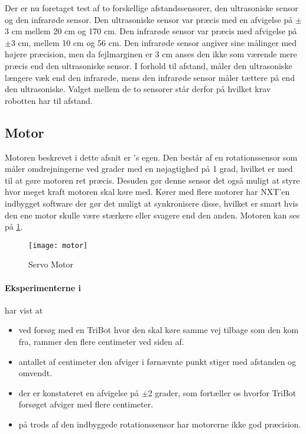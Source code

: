 Der er nu foretaget test af to forskellige afstandssensorer, den ultrasoniske sensor og den infrarøde sensor. 
Den ultrasoniske sensor var præcis med en afvigelse på $\pm$3 cm mellem 20 cm og 170 cm.
Den infrarøde sensor var præcis med afvigelse på $\pm$3 cm, mellem 10 cm og 56 cm.
Den infrarøde sensor angiver sine målinger med højere præcision, men da fejlmarginen er 3 cm anses den ikke som værende mere præcis end den ultrasoniske sensor.
I forhold til afstand, måler den ultrasoniske længere væk end den infrarøde, mens den infrarøde sensor måler tættere på end den ultrasoniske.
Valget mellem de to sensorer står derfor på hvilket krav robotten har til afstand.

\subsection{Motor}
Motoren beskrevet i dette afsnit er \lego's egen.
Den består af en rotationssensor som måler omdrejningerne ved grader med en nøjagtighed på 1 grad, hvilket er med til at gøre motoren ret præcis. 
Desuden gør denne sensor det også muligt at styre hvor meget kraft motoren skal køre med.
Kører med flere motorer har NXT'en indbygget software der gør det muligt at synkronisere disse, hvilket er smart hvis den ene motor skulle være stærkere eller svagere end den anden.\cite{tikNXT}
Motoren kan ses på \cref{sensor:motor_sensor}.
\\

\begin{figure}[h]
\centering
\texttt{[image: motor]} 	
\caption{\legoms Servo Motor}
\label{sensor:motor_sensor}
\end{figure}

\paragraph{Eksperimenterne i \cite{tikNXT}} har vist at
\begin{itemize}
\item ved forsøg med en TriBot hvor den skal køre samme vej tilbage som den kom fra, rammer den flere centimeter ved siden af.
\item antallet af centimeter den afviger i førnævnte punkt stiger med afstanden og omvendt. 
\item der er konstateret en afvigelse på $\pm$2 grader, som fortæller os hvorfor TriBot forsøget afviger med flere centimeter.
\item på trods af den indbyggede rotationssensor har motorerne ikke god præcision.
\end{itemize}

